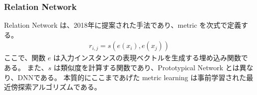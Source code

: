 \documentclass{jsarticle}
\begin{document}
\subsubsection{Relation Network}
Relation Network は、2018年に提案された手法であり、metric を次式で定義する。
\begin{eqnarray}
  \label{RN}
  r_{i,j} = s(e(x_i),e(x_j))
\end{eqnarray}
ここで、関数 $e$ は入力インスタンスの表現ベクトルを生成する埋め込み関数である。
また、$s$ は類似度を計算する関数であり、Prototypical Network とは異なり、DNNである。
本質的にここまであげた metric learning は事前学習された最近傍探索アルゴリズムである。







\end{document}

